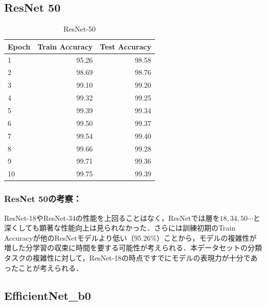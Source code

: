 \documentclass[a4paper,11pt,titlepage]{jsarticle}
\begin{document}
\subsection{ResNet 50}

\begin{table}[H]
\centering
\caption{ResNet-50}
\label{tab:ResNet50}
\begin{tabular}{lrr}
\hline
 Epoch &  Train Accuracy &  Test Accuracy \\
\hline
     1 &           95.26 &                98.58 \\
     2 &           98.69 &                98.76 \\
     3 &           99.10 &                99.20 \\
     4 &           99.32 &                99.25 \\
     5 &           99.39 &                99.34 \\
     6 &           99.50 &                99.37 \\
     7 &           99.54 &                99.40 \\
     8 &           99.66 &                99.28 \\
     9 &           99.71 &                99.36 \\
    10 &           99.75 &                99.39 \\
\hline
\end{tabular}
\end{table}

\subsubsection*{ResNet 50の考察：}
ResNet-18やResNet-34の性能を上回ることはなく，ResNetでは層を$18,34,50 \cdots$と深くしても顕著な性能向上は見られなかった．さらには訓練初期のTrain Accuracyが他のResNetモデルより低い（95.26\%）ことから，モデルの複雑性が増した分学習の収束に時間を要する可能性が考えられる．本データセットの分類タスクの複雑性に対して，ResNet-18の時点ですでにモデルの表現力が十分であったことが考えられる．


\subsection{EfficientNet\_b0}
\end{document}
